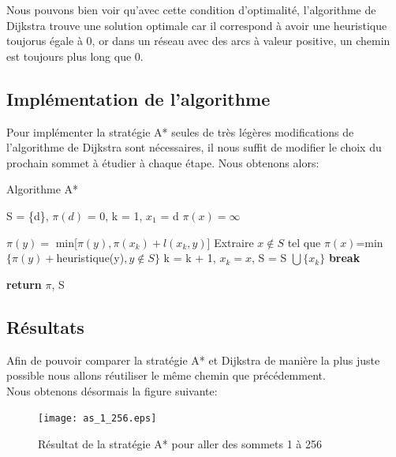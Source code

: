 \documentclass{article}
\begin{document}
Nous pouvons bien voir qu'avec cette condition d'optimalité, l'algorithme de Dijkstra trouve une solution
optimale car il correspond à avoir une heuristique toujorus égale à 0, or dans un réseau avec des arcs
à valeur positive, un chemin est toujours plus long que 0.

\subsection{Implémentation de l'algorithme}

Pour implémenter la stratégie A* seules de très légères modifications de l'algorithme de Dijkstra sont
nécessaires, il nous suffit de modifier le choix du prochain sommet à étudier à chaque étape.
Nous obtenons alors:\\

\begin{algorithm}
\caption{Algorithme A*}\label{astar}
\begin{algorithmic}[1]
	\State S = \{d\}, $\pi(d)$ = 0, k = 1, $x_1$ = d
		\State $\pi(x) = \infty$
	\EndFor
	
			\State $\pi(y) = $ min[$\pi(y), \pi(x_k) + l(x_k, y)$]
		\EndFor
		\State Extraire $x \not\in S$ tel que $\pi(x)$=min$\{\pi(y)+$heuristique(y)$, y \not\in S\}$
		\State k = k + 1, $x_k = x$, S = S $\bigcup \{x_k\}$
			\State \textbf{break}
		\EndIf
	\EndWhile
	
	\State \textbf{return} $\pi$, S
\EndProcedure 
\end{algorithmic}
\end{algorithm}

\subsection{Résultats}

Afin de pouvoir comparer la stratégie A* et Dijkstra de manière la plus juste possible nous allons
réutiliser le même chemin que précédemment.\\

Nous obtenons désormais la figure suivante:\\

\begin{figure}[!hbt]
	\centering
		\texttt{[image: as\_1\_256.eps]}
	\caption{Résultat de la stratégie A* pour aller des sommets 1 à 256}
	\label{as_1}
\end{figure}
\end{document}

